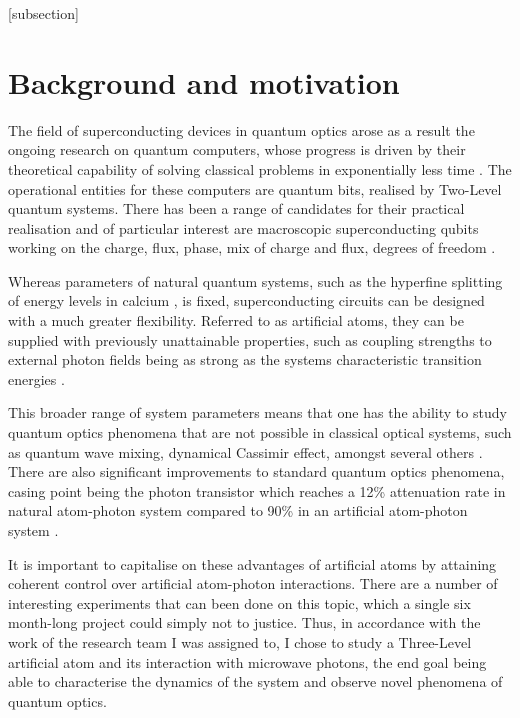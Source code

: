 \tableofcontents
[subsection]
\newpage
 
\section{Background and motivation\label{sec:BackgroundAndMotivation}}
 The field of superconducting devices in quantum optics arose as a result the ongoing research on quantum computers, whose progress is driven by their theoretical capability of solving classical problems in exponentially less time \cite{feynman_SimulatingPhysicsComputers,grover_FastQuantumMechanicalAlgorithmForDatabaseSearch,discreteLog}. The operational entities for these computers are quantum bits, realised by Two-Level quantum systems. There has been a range of candidates for their practical realisation and of particular interest are macroscopic superconducting qubits working on the charge, flux, phase, mix of charge and flux, degrees of freedom \cite{nakamura_CoherentControlofQuantumStates, mooij_FluxQubit, rabiOscillationsInJJQubit, chargeInsenstitiveQubit}.
 
 Whereas parameters of natural quantum systems, such as the hyperfine splitting of energy levels in calcium \cite{Leibfried:00}, is fixed, superconducting circuits can be designed with a much greater flexibility. Referred to as artificial atoms, they can be supplied with previously unattainable properties, such as coupling strengths to external photon fields being as strong as the systems characteristic transition energies \cite{Atomicphysicsandquantumoptics}.
 
 This broader range of system parameters means that one has the ability to study quantum optics phenomena that are not possible in classical optical systems, such as quantum wave mixing, dynamical Cassimir effect, amongst several others \cite{Atomicphysicsandquantumoptics}. There are also significant improvements to standard quantum optics phenomena, casing point being the photon transistor which reaches a 12\% attenuation rate in natural atom-photon system \cite{Hwang:2009aa} compared to 90\% in an artificial atom-photon system \cite{astafiev_ResonanceSingleAtom}.
 
 It is important to capitalise on these advantages of artificial atoms by attaining coherent control over artificial atom-photon interactions. There are a number of interesting experiments that can been done on this topic, which a single six month-long project could simply not to justice. Thus, in accordance with the work of the research team I was assigned to, I chose to study a Three-Level artificial atom and its interaction with microwave photons, the end goal being able to characterise the dynamics of the system and observe novel phenomena of quantum optics.
 
